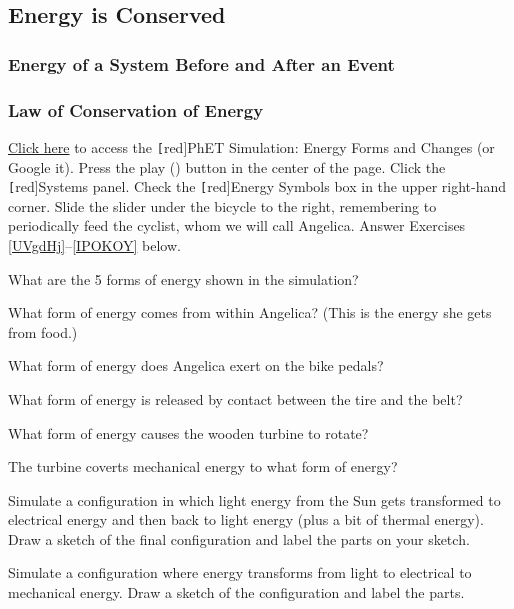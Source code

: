 \documentclass[]{exam}
\begin{document}
\clearpage

\subsection{Energy is Conserved}

\subsubsection{Energy of a System Before and After an Event}

\subsubsection{Law of Conservation of Energy}

\begin{questions}

\question 
\href{https://phet.colorado.edu/en/simulations/energy-forms-and-changes}{Click here} to access the \texttt[red]{PhET Simulation: Energy Forms and Changes} (or Google it). Press the play ({\tiny \faPlay}) button in the center of the page. Click the \texttt[red]{Systems} panel. Check the \texttt[red]{Energy Symbols} box in the upper right-hand corner. Slide the slider under the bicycle to the right, remembering to periodically feed the cyclist, whom we will call Angelica. Answer Exercises \ref{UVgdHj}--\ref{IPOKOY} below.


\question \label{UVgdHj}
What are the 5 forms of energy shown in the simulation?


\question
What form of energy comes from within Angelica? (This is the energy she gets from food.)


\question
What form of energy does Angelica exert on the bike pedals?


\question
What form of energy is released by contact between the tire and the belt? 


\question
What form of energy causes the wooden turbine to rotate?


\question
The turbine coverts mechanical energy to what form of energy?


\question
Simulate a configuration in which light energy from the Sun gets transformed to electrical energy and then back to light energy (plus a bit of thermal energy). Draw a sketch of the final configuration and label the parts on your sketch.


\question
Simulate a configuration where energy transforms from light to electrical to mechanical energy. Draw a sketch of the configuration and label the parts.



\end{questions}
\end{document}

